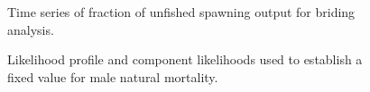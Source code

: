 \documentclass[
]{scrartcl}
\begin{document}
\begin{figure}[H]


\caption{\label{fig-Bratio_Bridging}Time series of fraction of unfished
spawning output for briding analysis.}

\end{figure}%

\newpage

\begin{figure}[H]


\caption{\label{fig-M-profile-explore}Likelihood profile and component
likelihoods used to establish a fixed value for male natural mortality.}

\end{figure}%
\end{document}

